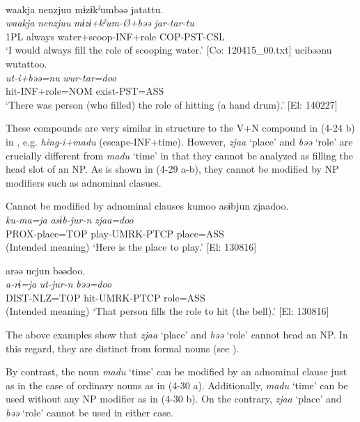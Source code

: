 \ex{}\\
\glll     waakja  {\textbar}nenzjuu{\textbar}  mɨzɨkˀumbəə  jatattu.\\
      \textit{waakja}  \textit{nenzjuu}  \textit{mɨzɨ+kˀum-Ø+bəə}  \textit{jar-tar-tu}\\
      1PL  always  water+scoop-INF+role  COP-PST-CSL\\
      \glt       ‘I would always fill the role of scooping water.’ [Co: 120415\_00.txt]
\ex %
\glll   ucibəənu  wutattoo.\\
      \textit{ut-i+bəə=nu}  \textit{wur-tar=doo}\\
      hit-INF+role=NOM  exist-PST=ASS\\
      \glt       ‘There was person (who filled) the role of hitting (a hand drum).’ [El: 140227]
    \z
\z

These compounds are very similar in structure to the V+N compound in (4-24 b) in , e.g. \textit{hing-i+madu} (escape-INF+time). However, \textit{zjaa} ‘place’ and \textit{bəə} ‘role’ are crucially different from \textit{madu} ‘time’ in that they cannot be analyzed as filling the head slot of an NP. As is shown in (4-29 a-b), they cannot be modified by NP modifiers such as adnominal clasues.

\ea  Cannot be modified by adnominal clauses \label{ex:4.29}
\ea\label{ex:4.29a}
\glll   *kumoo  asɨbjun  zjaadoo.\\
       \textit{ku-ma=ja}  \textit{asɨb-jur-n}  \textit{zjaa=doo}\\
      PROX-place=TOP  play-UMRK-PTCP  place=ASS\\
      \glt       (Intended meaning) ‘Here is the place to play.’ [El: 130816]

\ex\label{ex:4.29b} %
\glll  *arəə  ucjun  bəədoo.\\
       \textit{a-rɨ=ja}  \textit{ut-jur-n}  \textit{bəə=doo}\\
       DIST-NLZ=TOP  hit-UMRK-PTCP  role=ASS\\
      \glt       (Intended meaning) ‘That person fills the role to hit (the bell).’ [El: 130816]
    \z
\z

The above examples show that \textit{zjaa} ‘place’ and \textit{bəə} ‘role’ cannot head an NP. In this regard, they are distinct from formal nouns (see ).

By contrast, the noun \textit{madu} ‘time’ can be modified by an adnominal clause just as in the case of ordinary nouns as in (4-30 a). Additionally, \textit{madu} ‘time’ can be used without any NP modifier as in (4-30 b). On the contrary, \textit{zjaa} ‘place’ and \textit{bəə} ‘role’ cannot be used in either case.

